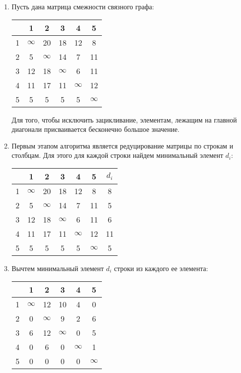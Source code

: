 \documentclass[a4paper, 12pt] {article}
\begin{document}
\begin{enumerate}
\item Пусть дана матрица смежности связного графа:

\begin{tabular}{|c|c|c|c|c|c|}
\hline
& 1 & 2 & 3 & 4 & 5 \\
\hline
 1 & $\infty$ & 20 & 18 & 12 & 8 \\
\hline
2 & 5 & $\infty$ & 14 & 7 & 11 \\
\hline
3 & 12 & 18 & $\infty$ & 6 & 11 \\
\hline
4 & 11 & 17 & 11 & $\infty$ & 12 \\
\hline
5 & 5 & 5 & 5 & 5 & $\infty$ \\
\hline
\end{tabular}

Для того, чтобы исключить зацикливание, элементам, лежащим на главной диагонали присваивается бесконечно большое значение.


\item Первым этапом алгоритма является редуцирование матрицы по строкам и столбцам. Для этого для каждой строки найдем минимальный элемент $d_{i}$:

\begin{tabular}{|c|c|c|c|c|c|c|}
\hline
& 1 & 2 & 3 & 4 & 5 & $d_{i}$\\
\hline
 1 & $\infty$ & 20 & 18 & 12 & 8 & 8\\
\hline
2 & 5 & $\infty$ & 14 & 7 & 11 & 5\\
\hline
3 & 12 & 18 & $\infty$ & 6 & 11 & 6\\
\hline
4 & 11 & 17 & 11 & $\infty$ & 12 & 11\\
\hline
5 & 5 & 5 & 5 & 5 & $\infty$ & 5\\
\hline
\end{tabular}


\item Вычтем минимальный элемент $d_{i}$ строки из каждого ее элемента:

\begin{tabular}{|c|c|c|c|c|c|}
\hline
& 1 & 2 & 3 & 4 & 5 \\
\hline
 1 & $\infty$ & 12 & 10 & 4 & 0 \\
\hline
2 & 0 & $\infty$ & 9 & 2 & 6 \\
\hline
3 & 6 & 12 & $\infty$ & 0 & 5 \\
\hline
4 & 0 & 6 & 0 & $\infty$ & 1 \\
\hline
5 & 0 & 0 & 0 & 0 & $\infty$ \\
\hline
\end{tabular}



\end{enumerate}
\end{document}
